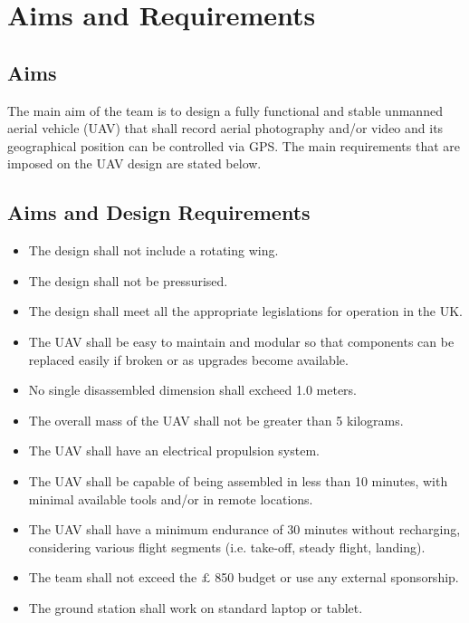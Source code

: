 \documentclass[12pt]{article}
\begin{document}
\begin{landscape}

\end{landscape}

\tableofcontents

\newpage

\section{Aims and Requirements}

\subsection{Aims}

\noindent The main aim of the team is to design a fully functional and stable unmanned aerial vehicle (UAV) that shall record aerial photography and/or video and its geographical position can be controlled via GPS. The main requirements that are imposed on the UAV design are stated below. \\

\subsection{Aims and Design Requirements}

\begin{itemize}
    \item The design shall not include a rotating wing.
    \item The design shall not be pressurised.
    \item The design shall meet all the appropriate legislations for operation in the UK.
    \item The UAV shall be easy to maintain and modular so that components can be replaced easily if broken or as upgrades become available.
    \item No single disassembled dimension shall excheed 1.0 meters. 
    \item The overall mass of the UAV shall not be greater than 5 kilograms. 
    \item The UAV shall have an electrical propulsion system.
    \item The UAV shall be capable of being assembled in less than 10 minutes, with minimal available tools and/or in remote locations.
    \item The UAV shall have a minimum endurance of 30 minutes without recharging, considering various flight segments (i.e. take-off, steady flight, landing).
    \item The team shall not exceed the $\pounds$ 850 budget or use any external sponsorship. 
    \item The ground station shall work on standard laptop or tablet.
\end{itemize}
\end{document}
